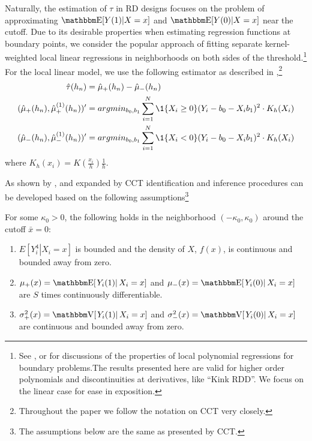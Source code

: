 \documentclass[12pt,fleqn]{article}
\begin{document}
Naturally, the estimation of $\tau$ in RD designs focuses on the 
problem of approximating $\E[Y(1)|X=x]$ and $\E[Y(0)|X=x]$
near the cutoff. Due to its desirable properties when estimating regression 
functions at boundary points, we consider the popular approach of fitting 
separate kernel-weighted local linear regressions in neighborhoods on both 
sides of the threshold.\footnote{See \cite{HTV2001}, \cite{Porter03} or
\cite{FanGijbels92} for discussions of the properties of local polynomial 
regressions for boundary problems.The results presented here are valid for
higher order polynomials and discontinuities at derivatives, like ``Kink RDD''. We focus on the linear case for ease in exposition.}
For the local linear model, we use the following estimator as described in 
\cite{calonico2014},\footnote{Throughout the paper we follow the
notation on CCT very closely.}
\begin{align*}
 \hat{\tau}(h_{n})&=\hat {\mu}_{+}(h_{n}) -\hat{\mu}_{-}(h_{n})\\
(\hat {\mu}_{+}(h_{n}),\hat {\mu}^{(1)}_{+}(h_{n}))'&= argmin_{b_{0},b_{1}} 
\sum_{i=1}^{N}\1\{X_{i} \geq 0\}(Y_{i}-b_{0}-X_{i}b_{1})^{2} \cdot K_{h}(X_{i})\\
(\hat {\mu}_{-}(h_{n}),\hat {\mu}^{(1)}_{-}(h_{n}))' &= argmin_{b_{0},b_{1}}
\sum_{i=1}^{N}\1\{X_{i} < 0\}(Y_{i}-b_{0}-X_{i}b_{1})^{2}\cdot K_{h}(X_{i})
\end{align*}
where $K_{h}(x_{i}) = K\left(\frac{x_{i}}{h}\right)\frac{1}{h}$.

As shown by \cite{HTV2001}, \cite{Porter03} and expanded by CCT identification and inference procedures can be developed based on the following assumptions\footnote{The assumptions below are the same as presented by CCT.}
\begin{assumption}\label{A1}
 For some $\kappa_{0} > 0$, the following holds in the neighborhood $(-\kappa_{0},\kappa_{0})$ around the cutoff $ \bar{x}= 0$:
 \begin{enumerate}
  \item $E[\left.Y_{i}^{4}\right|X_{i}=x]$ is bounded and the density of $X$, $f(x)$, is continuous and bounded away from zero.
  \item $\mu_{+}(x)=\E[\left.Y_{i}(1)\right|X_{i}=x]$ and $\mu_{-}(x)=\E[\left.Y_{i}(0)\right|X_{i}=x]$ are $S$ times continuously differentiable.
  \item $\sigma^{2}_{+}(x)=\V[\left.Y_{i}(1)\right|X_{i}=x]$ and $\sigma^{2}_{-}(x)=\V[\left.Y_{i}(0)\right|X_{i}=x]$ are continuous and bounded away from zero.
 \end{enumerate}
\end{assumption}
\end{document}
